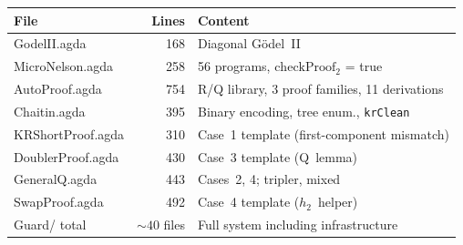 \documentclass[11pt]{article}
\begin{document}
\medskip
\begin{center}
\begin{tabular}{lrl}
\textbf{File} & \textbf{Lines} & \textbf{Content} \\
\hline
GodelII.agda & 168 & Diagonal G\"odel~II \\
MicroNelson.agda & 258 & 56 programs, $\mathrm{checkProof}_2$ = true \\
AutoProof.agda & 754 & R/Q library, 3 proof families, 11 derivations \\
Chaitin.agda & 395 & Binary encoding, tree enum., \texttt{krClean} \\
KRShortProof.agda & 310 & Case~1 template (first-component mismatch) \\
DoublerProof.agda & 430 & Case~3 template (Q~lemma) \\
GeneralQ.agda & 443 & Cases~2, 4; tripler, mixed \\
SwapProof.agda & 492 & Case~4 template ($h_2$~helper) \\
\hline
Guard/ total & ${\sim}40$ files & Full system including infrastructure \\
\end{tabular}
\end{center}



\end{document}
